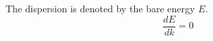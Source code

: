 \documentclass{article}
\begin{document}
The dispersion is denoted by the bare energy $E$.
\begin{equation}
  \frac{dE}{dk}=0
\end{equation}
\end{document}
